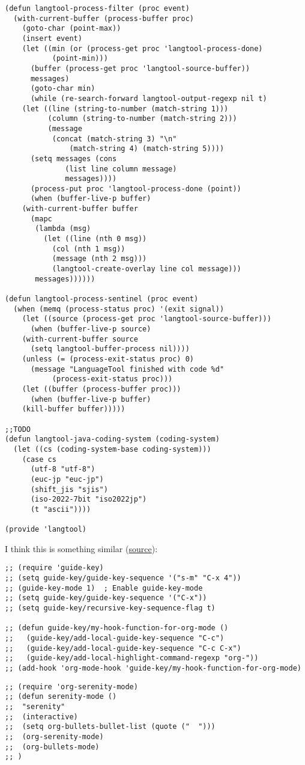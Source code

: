 \documentclass[11pt]{article}
\begin{document}
\begin{verbatim}
(defun langtool-process-filter (proc event)
  (with-current-buffer (process-buffer proc)
    (goto-char (point-max))
    (insert event)
    (let ((min (or (process-get proc 'langtool-process-done)
		   (point-min)))
	  (buffer (process-get proc 'langtool-source-buffer))
	  messages)
      (goto-char min)
      (while (re-search-forward langtool-output-regexp nil t)
	(let ((line (string-to-number (match-string 1)))
	      (column (string-to-number (match-string 2)))
	      (message
	       (concat (match-string 3) "\n" 
		       (match-string 4) (match-string 5))))
	  (setq messages (cons
			  (list line column message)
			  messages))))
      (process-put proc 'langtool-process-done (point))
      (when (buffer-live-p buffer)
	(with-current-buffer buffer
	  (mapc
	   (lambda (msg)
	     (let ((line (nth 0 msg))
		   (col (nth 1 msg))
		   (message (nth 2 msg)))
	       (langtool-create-overlay line col message)))
	   messages))))))

(defun langtool-process-sentinel (proc event)
  (when (memq (process-status proc) '(exit signal))
    (let ((source (process-get proc 'langtool-source-buffer)))
      (when (buffer-live-p source)
	(with-current-buffer source
	  (setq langtool-buffer-process nil))))
    (unless (= (process-exit-status proc) 0)
      (message "LanguageTool finished with code %d" 
	       (process-exit-status proc)))
    (let ((buffer (process-buffer proc)))
      (when (buffer-live-p buffer)
	(kill-buffer buffer)))))

;;TODO
(defun langtool-java-coding-system (coding-system)
  (let ((cs (coding-system-base coding-system)))
    (case cs
      (utf-8 "utf-8")
      (euc-jp "euc-jp")
      (shift_jis "sjis")
      (iso-2022-7bit "iso2022jp")
      (t "ascii"))))

(provide 'langtool)
\end{verbatim}
\label{sec:orgbe9254f}
I think this is something similar (\href{https://github.com/kai2nenobu/guide-key}{source}):
\begin{verbatim}
;; (require 'guide-key)
;; (setq guide-key/guide-key-sequence '("s-m" "C-x 4"))
;; (guide-key-mode 1)  ; Enable guide-key-mode
;; (setq guide-key/guide-key-sequence '("C-x"))
;; (setq guide-key/recursive-key-sequence-flag t)

;; (defun guide-key/my-hook-function-for-org-mode ()
;;   (guide-key/add-local-guide-key-sequence "C-c")
;;   (guide-key/add-local-guide-key-sequence "C-c C-x")
;;   (guide-key/add-local-highlight-command-regexp "org-"))
;; (add-hook 'org-mode-hook 'guide-key/my-hook-function-for-org-mode)
\end{verbatim}
\label{sec:orgadf39b1}
\begin{verbatim}
;; (require 'org-serenity-mode)
;; (defun serenity-mode ()
;;  "serenity"
;;  (interactive)
;;  (setq org-bullets-bullet-list (quote ("  ")))
;;  (org-serenity-mode)  
;;  (org-bullets-mode)
;; )
\end{verbatim}
\label{sec:org841dec8}
\end{document}
